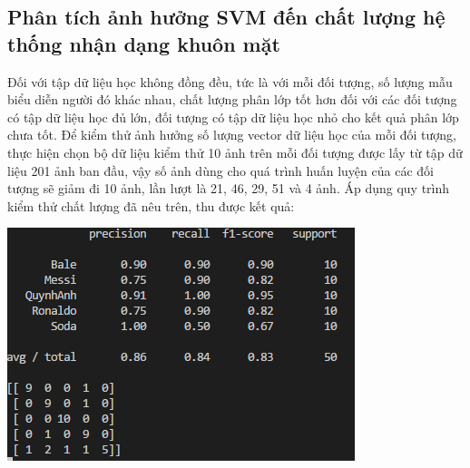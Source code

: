 \documentclass[12pt,a4paper]{article}
\begin{document}
\subsection{Phân tích ảnh hưởng SVM đến chất lượng hệ thống nhận dạng khuôn mặt}
Đối với tập dữ liệu học không đồng đều, tức là với mỗi đối tượng, số lượng mẫu biểu diễn người đó khác nhau, chất lượng phân lớp tốt hơn đối với các đối tượng có tập dữ liệu học đủ lớn, đối tượng có tập dữ liệu học nhỏ cho kết quả phân lớp chưa tốt. Để kiểm thử ảnh hưởng số lượng vector dữ liệu học của mỗi đối tượng, thực hiện chọn bộ dữ liệu kiểm thử 10 ảnh trên mỗi đối tượng được lấy từ tập dữ liệu 201 ảnh ban đầu, vậy số ảnh dùng cho quá trình huấn luyện của các đối tượng sẽ giảm đi 10 ảnh, lần lượt là 21, 46, 29, 51 và 4 ảnh. Áp dụng quy trình kiểm thử chất lượng đã nêu trên, thu được kết quả: \par 
\begin{center}
\includegraphics[scale=0.9]{35.png}
\end{center}
\par 
\end{document}
